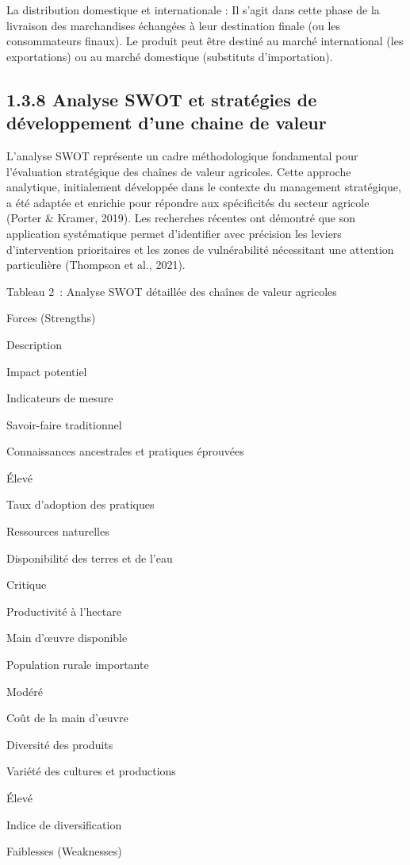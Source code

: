 \documentclass[12pt,oneside]{report}
\begin{document}
La distribution domestique et internationale : Il s’agit dans cette phase de la livraison des marchandises échangées à leur destination finale (ou les consommateurs finaux). Le produit peut être destiné au marché international (les exportations) ou au marché domestique (substituts d’importation).

\subsection{1.3.8 Analyse SWOT et stratégies de développement d’une chaine de valeur}
L'analyse SWOT représente un cadre méthodologique fondamental pour l'évaluation stratégique des chaînes de valeur agricoles. Cette approche analytique, initialement développée dans le contexte du management stratégique, a été adaptée et enrichie pour répondre aux spécificités du secteur agricole (Porter \& Kramer, 2019). Les recherches récentes ont démontré que son application systématique permet d'identifier avec précision les leviers d'intervention prioritaires et les zones de vulnérabilité nécessitant une attention particulière (Thompson et al., 2021).

Tableau 2 : Analyse SWOT détaillée des chaînes de valeur agricoles

Forces (Strengths)

Description

Impact potentiel

Indicateurs de mesure

Savoir-faire traditionnel

Connaissances ancestrales et pratiques éprouvées

Élevé

Taux d'adoption des pratiques

Ressources naturelles

Disponibilité des terres et de l'eau

Critique

Productivité à l'hectare

Main d'œuvre disponible

Population rurale importante

Modéré

Coût de la main d'œuvre

Diversité des produits

Variété des cultures et productions

Élevé

Indice de diversification

Faiblesses (Weaknesses)
\end{document}
